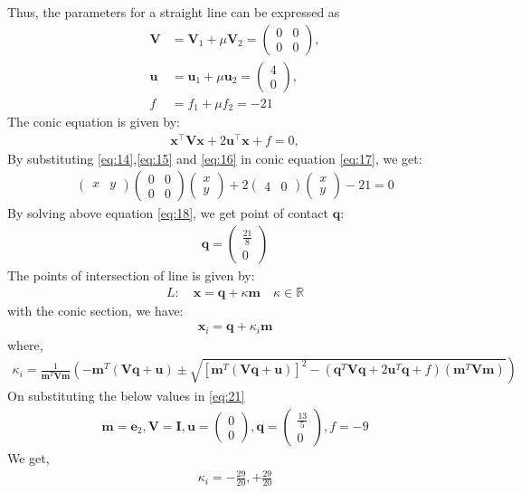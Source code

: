 \documentclass[12pt]{article}
\newcommand{\myvec}[1]{\ensuremath{\begin{pmatrix}#1\end{pmatrix}}}
\let\vec\mathbf
\let\vec\mathbf
\providecommand{\brak}[1]{\ensuremath{\left(#1\right)}}
\providecommand{\lbrak}[1]{\ensuremath{\left(#1\right.}}
\providecommand{\rbrak}[1]{\ensuremath{\left.#1\right)}}
\providecommand{\sbrak}[1]{\ensuremath{{}\left[#1\right]}}
\providecommand{\brak}[1]{\ensuremath{\left(#1\right)}}
\let\vec\mathbf
\begin{document}
Thus, the parameters for a straight line can be expressed as
 \begin{align}
 \label{eq:14}
	\vec{V} &= 
\vec{V}_1 + \mu\vec{V}_2
=\myvec{ 0 & 0 \\ 0 & 0},
\\ \label{eq:15}
	\vec{u} &=
\vec{u}_1+\mu \vec{u}_2
	= \myvec{
4\\
0
},
\\ \label{eq:16}
f&=f_1 + \mu f_2=-21
\end{align}
The conic equation is given by:
 \begin{align}
 \vec{x}^\top\vec{V}\vec{x}+2\vec{u}^\top\vec{x}+f=0, 
  \label{eq:17}
 \end{align}
By substituting \eqref{eq:14},\eqref{eq:15} and \eqref{eq:16} in conic equation \eqref{eq:17}, we get:
\begin{align}
\myvec{x&y}\myvec{0&0\\0&0}\myvec{x\\y}+2\myvec{4&0}\myvec{x\\y}-21=0
\label{eq:18}
\end{align}
By solving above equation \eqref{eq:18}, we get point of contact $\vec{q}$:
\begin{align}
\vec{q}=\myvec{\frac{21}{8}\\[2pt]0}
\end{align}
The points of intersection of line is given by: 
\begin{align}
L: \quad \vec{x} = \vec{q} + \kappa \vec{m} \quad \kappa \in \mathbb{R}
\end{align}
with the conic section, we have:
 \begin{align}
 \vec{x}_i = \vec{q} + \kappa_i \vec{m}
 \end{align}
 where, 
\begin{align}
\kappa_i = \frac{1}
{\vec{m}^T\vec{V}\vec{m}}
\lbrak{-\vec{m}^T\brak{\vec{V}\vec{q}+\vec{u}}}
\pm
\rbrak{\sqrt{
\sbrak{
\vec{m}^T\brak{\vec{V}\vec{q}+\vec{u}}
}^2
-
\brak
{
\vec{q}^T\vec{V}\vec{q} + 2\vec{u}^T\vec{q} +f
}
\brak{\vec{m}^T\vec{V}\vec{m}}
}
}
\label{eq:21}
\end{align}
On substituting the below values in \eqref{eq:21}
\begin{align}
 \vec{m}=\vec{e}_2,\vec{V}=\vec{I},\vec{u}=\myvec{0\\0},\vec{q}=\myvec{\frac{13}{5}\\[2pt]0},f=-9
\end{align}
We get,
\begin{align}
\kappa_i=-\frac{29}{20},+\frac{29}{20}
\end{align}
\end{document}
